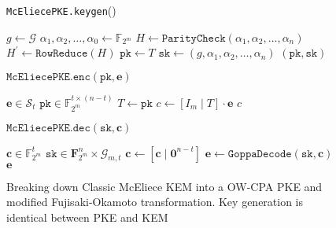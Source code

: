 \documentclass[runningheads]{llncs}
\newcommand{\pk}{\texttt{pk}}
\newcommand{\sk}{\texttt{sk}}
\begin{document}
\begin{figure}[H]
    \centering

    \begin{algorithm}[H]
        \caption*{\texttt{McEliecePKE.keygen}()}
        \begin{algorithmic}[1]
                \State $g \leftarrow \mathcal{G}$
                \State $\alpha_1, \alpha_2, \ldots, \alpha_0 \leftarrow \mathbb{F}_{2^m}$
                \State $H \leftarrow \texttt{ParityCheck}(\alpha_1, \alpha_2, \ldots, \alpha_n)$
                \State $H^\prime \leftarrow \texttt{RowReduce}(H)$
                    \State $\pk \leftarrow T$
                    \State $\sk \leftarrow (g, \alpha_1, \alpha_2, \ldots, \alpha_n)$
                    \State \Return $(\pk, \sk)$
                \EndIf
            \EndWhile
        \end{algorithmic}
    \end{algorithm}
    \begin{algorithm}[H]
        \caption*{$\texttt{McEliecePKE.enc}(\pk, \mathbf{e})$}
        \begin{algorithmic}[1]
            \Require $\mathbf{e} \in \mathcal{S}_t$
            \Require $\pk \in \mathbb{F}_{2^m}^{t \times (n - t)}$
            \State $T \leftarrow \pk$
            \State $c \leftarrow [I_m \mid T] \cdot \mathbf{e}$
            \State \Return $c$
        \end{algorithmic}
    \end{algorithm}
    \begin{algorithm}[H]
        \caption*{$\texttt{McEliecePKE.dec}(\sk, \mathbf{c})$}
        \begin{algorithmic}[1]
            \Require $\mathbf{c} \in \mathbb{F}_{2^m}^t$
            \Require $\sk \in \mathbf{F}_{2^m}^n \times \mathcal{G}_{m,t}$
            \State $\mathbf{c} \leftarrow [\mathbf{c} \mid \mathbf{0}^{n-t}]$
            \State $\mathbf{e} \leftarrow \texttt{GoppaDecode}(\sk, \mathbf{c})$
            \State \Return $\mathbf{e}$
        \end{algorithmic}
    \end{algorithm}
    \caption{Breaking down Classic McEliece KEM into a OW-CPA PKE and modified Fujisaki-Okamoto transformation. Key generation is identical between PKE and KEM}\label{fig:mceliece-routines}
\end{figure}
\end{document}
